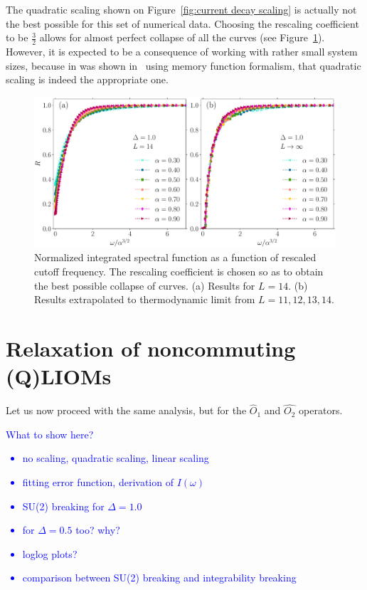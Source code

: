 The quadratic scaling shown on Figure~\ref{fig:current decay scaling} is actually not the
best possible for this set of numerical data. Choosing the rescaling coefficient to be
\(\frac{3}{2}\) allows for almost perfect collapse of all the curves 
(see Figure~\ref{fig:current decay perfect scaling}). However, it is expected to be a consequence
of working with rather small system sizes, because in was shown 
in~\textcite{Mierzejewski2015Approx} using memory function formalism, that quadratic scaling
is indeed the appropriate one.
\begin{figure}[htbp]
  \centering
  \includegraphics[width=\textwidth]{Figures/current_perfect_scaling.pdf}
  \caption{Normalized integrated spectral function as a function of 
  rescaled cutoff frequency. The rescaling coefficient is chosen so as to obtain the 
  best possible collapse of curves. (a) Results for \(L=14\). (b) Results extrapolated
   to thermodynamic limit from \(L=11,12,13,14\).}\label{fig:current decay perfect scaling}
\end{figure}



\section{Relaxation of noncommuting (Q)LIOMs}
Let us now proceed with the same analysis, but for the \(\hat{O}_1\) and \(\hat{O_2}\)
operators.

\textcolor{blue}{What to show here?
\begin{itemize}
  \item no scaling, quadratic scaling, linear scaling
  \item fitting error function, derivation of \(I(\omega)\)
  \item SU(2) breaking for \(\Delta=1.0\)
  \item for \(\Delta = 0.5\) too? why?
  \item loglog plots?
  \item comparison between SU(2) breaking and integrability breaking
\end{itemize}
}